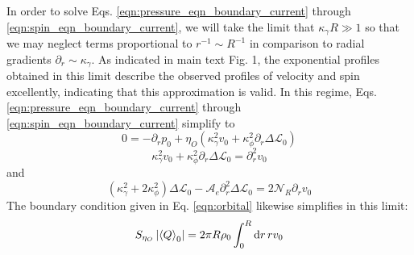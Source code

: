 \documentclass[%
 reprint,
superscriptaddress,
longbibliography,
 amsmath,amssymb,
 prl,
 citeautoscript,
]{revtex4-1}
\begin{document}
In order to solve Eqs. \ref{eqn:pressure_eqn_boundary_current} through \ref{eqn:spin_eqn_boundary_current}, we will take the limit that $\kappa_{\gamma} R \gg 1$ so that we may neglect terms proportional to $r^{-1} \sim R^{-1}$ in comparison to radial gradients $\partial_r \sim \kappa_{\gamma}$. As indicated in main text Fig. 1, the exponential profiles obtained in this limit describe the observed profiles of velocity and spin excellently, indicating that this approximation is valid. In this regime, Eqs. \ref{eqn:pressure_eqn_boundary_current} through \ref{eqn:spin_eqn_boundary_current} simplify to
\begin{equation}
0 = - \partial_r p_0 + \eta_O \left( \kappa_{\gamma}^2 v_0 + \kappa_{\phi}^2 \partial_r \Delta \mathcal{L}_0 \right)
\label{eqn:pressure_eqn_boundary_current_final}
\end{equation}
\begin{equation}
\kappa_{\gamma}^2 v_0 + \kappa_{\phi}^2 \partial_r \Delta \mathcal{L}_0 = \partial_r^2 v_0
\label{eqn:velocity_eqn_boundary_current_final}
\end{equation}
and
\begin{equation}
\left( \kappa_{\gamma}^2 + 2 \kappa_{\phi}^2 \right) \Delta \mathcal{L}_0 - \mathcal{A}_e \partial_r^2 \Delta \mathcal{L}_0 = 2 \mathcal{N}_R \partial_r v_0
\label{eqn:spin_eqn_boundary_current_final}
\end{equation}
The boundary condition given in Eq. \ref{eqn:orbital} likewise simplifies in this limit:
\begin{equation}
S_{\eta_O} \left| \left\langle Q \right\rangle_0 \right| = 2 \pi R \rho_0 \int_0^{R} {\rm d} r \, r v_0
\label{eqn:orbital_simple}
\end{equation}
\end{document}
